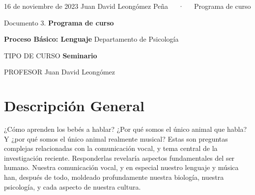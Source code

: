 \documentclass[11pt,a4paper,]{awesome-cv}
\begin{document}
\makecvheader

\makecvfooter
  {16 de noviembre de 2023}
    {Juan David Leongómez Peña~~~·~~~Programa de curso}
  {\thepage}





\vspace{4mm}
\begin{tcolorbox}[enhanced,
        on line, 
        boxsep=4pt, left=0pt,right=0pt,top=0pt,bottom=0pt,
        colframe=white,colback=black]
  
\color{white}
\begin{LARGE}\begin{center}
Documento 3. \textbf{Programa de curso}
\end{center}\end{LARGE}
\end{tcolorbox}

\begin{LARGE}\begin{center}
\textbf{Proceso Básico: Lenguaje}\linebreak
Departamento de Psicología
\end{center}\end{LARGE}

\begin{cvskills}
  \cvskill
    {TIPO DE CURSO}
    {\textbf{Seminario}}
    
  \cvskill
    {PROFESOR}
    {Juan David Leongómez}
\end{cvskills}

\hypertarget{descripciuxf3n-general}{%
\section{Descripción General}\label{descripciuxf3n-general}}

¿Cómo aprenden los bebés a hablar? ¿Por qué somos el único animal que
habla? Y ¿por qué somos el único animal realmente musical? Estas son
preguntas complejas relacionadas con la comunicación vocal, y tema
central de la investigación reciente. Responderlas revelaría aspectos
fundamentales del ser humano. Nuestra comunicación vocal, y en especial
nuestro lenguaje y música han, después de todo, moldeado profundamente
nuestra biología, nuestra psicología, y cada aspecto de nuestra cultura.
\end{document}
